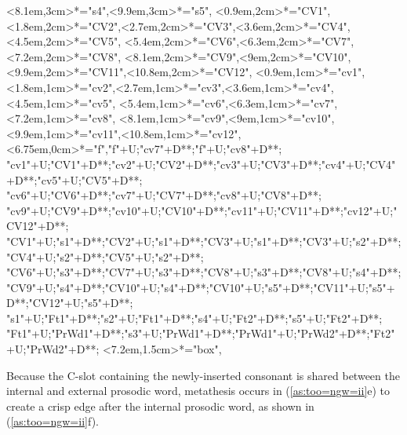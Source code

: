 \begin{multicols}{2}
\begin{exe}
{\begin{xlist}
{		<8.1em,3cm>*="s4",<9.9em,3cm>*="s5",
		<0.9em,2cm>*="CV1",<1.8em,2cm>*="CV2",<2.7em,2cm>*="CV3",<3.6em,2cm>*="CV4",<4.5em,2cm>*="CV5",
		<5.4em,2cm>*="CV6",<6.3em,2cm>*="CV7",<7.2em,2cm>*="CV8",
		<8.1em,2cm>*="CV9",<9em,2cm>*="CV10",<9.9em,2cm>*="CV11",<10.8em,2cm>*="CV12",
		<0.9em,1cm>*="cv1",<1.8em,1cm>*="cv2",<2.7em,1cm>*\as{ }="cv3",<3.6em,1cm>*="cv4",<4.5em,1cm>*\as{ }="cv5",
		<5.4em,1cm>*="cv6",<6.3em,1cm>*="cv7",<7.2em,1cm>*="cv8",
		<8.1em,1cm>*="cv9",<9em,1cm>*\as{ }="cv10",<9.9em,1cm>*="cv11",<10.8em,1cm>*\as{ }="cv12",
		<6.75em,0cm>*\as{\tsc{[+v.]}}="f","f"+U;"cv7"+D**\dir{-};"f"+U;"cv8"+D**\dir{-};
		"cv1"+U;"CV1"+D**\dir{-};"cv2"+U;"CV2"+D**\dir{-};"cv3"+U;"CV3"+D**\dir{};"cv4"+U;"CV4"+D**\dir{-};"cv5"+U;"CV5"+D**\dir{};
		"cv6"+U;"CV6"+D**\dir{-};"cv7"+U;"CV7"+D**\dir{-};"cv8"+U;"CV8"+D**\dir{-};
		"cv9"+U;"CV9"+D**\dir{-};"cv10"+U;"CV10"+D**\dir{};"cv11"+U;"CV11"+D**\dir{-};"cv12"+U;"CV12"+D**\dir{};
		"CV1"+U;"s1"+D**\dir{-};"CV2"+U;"s1"+D**\dir{-};"CV3"+U;"s1"+D**\dir{-};"CV3"+U;"s2"+D**\dir{-};"CV4"+U;"s2"+D**\dir{-};"CV5"+U;"s2"+D**\dir{-};
		"CV6"+U;"s3"+D**\dir{-};"CV7"+U;"s3"+D**\dir{-};"CV8"+U;"s3"+D**\dir{-};"CV8"+U;"s4"+D**\dir{-};
		"CV9"+U;"s4"+D**\dir{-};"CV10"+U;"s4"+D**\dir{-};"CV10"+U;"s5"+D**\dir{-};"CV11"+U;"s5"+D**\dir{-};"CV12"+U;"s5"+D**\dir{-};
		"s1"+U;"Ft1"+D**\dir{-};"s2"+U;"Ft1"+D**\dir{-};"s4"+U;"Ft2"+D**\dir{-};"s5"+U;"Ft2"+D**\dir{-};
		"Ft1"+U;"PrWd1"+D**\dir{-};"s3"+U;"PrWd1"+D**\dir{-};"PrWd1"+U;"PrWd2"+D**\dir{-};"Ft2"+U;"PrWd2"+D**\dir{-};
		<7.2em,1.5cm>*="box",
	\endxy}
	\end{xlist}}
\end{exe}
\end{multicols}

Because the C-slot containing the newly-inserted consonant
is shared between the internal and external prosodic word,
metathesis occurs in (\ref{as:too=ngw=ii}e) to create a crisp edge
after the internal prosodic word, as shown in (\ref{as:too=ngw=ii}f).

